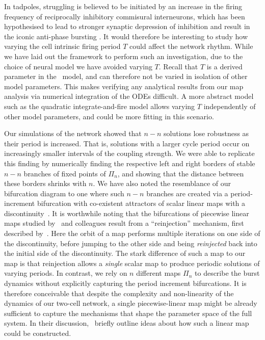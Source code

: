 \documentclass[utf8,draft]{frontiersFPHY} %
\begin{document}
In tadpoles, struggling is believed to be initiated by an increase in the firing frequency of reciprocally inhibitory commisural interneurons, which has been hypothesised to lead to stronger synaptic depression of inhibition and result in the iconic anti-phase bursting \citep{li2007}.
It would therefore be interesting to study how varying the cell intrinsic firing period $T$ could affect the network rhythm.
While we have laid out the framework to perform such an investigation, due to the choice of neural model we have avoided varying $T$.
Recall that $T$ is a derived parameter in the~\citet{morris1981} model, and can therefore not be varied in isolation of other model parameters.
This makes verifying any analytical results from our map analysis via numerical integration of the ODEs difficult.
A more abstract model such as the quadratic integrate-and-fire model \citep{izhikevich2004} allows varying $T$ independently of other model parameters, and could be more fitting in this scenario.

Our simulations of the network showed that $n-n$ solutions lose robustness as their period is increased.
That is, solutions with a larger cycle period occur on increasingly smaller intervals of the coupling strength.
We were able to replicate this finding by numerically finding the respective left and right borders of stable $n-n$ branches of fixed points of $\Pi_n$, and showing that the distance between these borders shrinks with $n$.
We have also noted the resemblance of our bifurcation diagram to one where such $n-n$ branches are created via a period-increment bifurcation with co-existent attractors of scalar linear maps with a discontinuity~\citep{avrutin2012,avrutin2011}.
It is worthwhile noting that the bifurcations of piecewise linear maps studied by~\citeauthor{avrutin2012} and colleagues result from a ``reinjection'' mechanism, first described by~\citet{perez1985}.
Here the orbit of a map performs multiple iterations on one side of the discontinuity, before jumping to the other side and being \textit{reinjected} back into the initial side of the discontinuity.
The stark difference of such a map to our map is that reinjection allows a \emph{single} scalar map to produce periodic solutions of varying periods.
In contrast, we rely on $n$ different maps $\Pi_n$ to describe the burst dynamics without explicitly capturing the period increment bifurcations.
It is therefore conceivable that despite the complexity and non-linearity of the dynamics of our two-cell network, a single piecewise-linear map might be already sufficient to capture the mechanisms that shape the parameter space of the full system.
In their discussion,~\citet{bose2011} briefly outline ideas about how such a linear map could be constructed.
\end{document}
